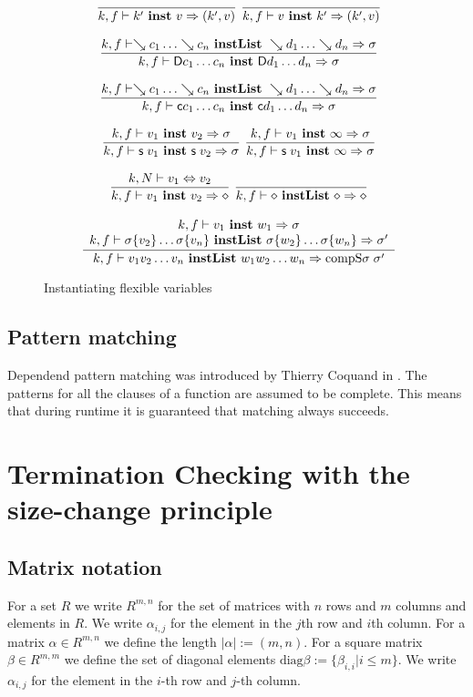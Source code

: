 \begin{figure}
\begin{gather*}
\nru{}
{}
{\inst{k}{f}{k'}{v}{(k',v)}}
%
\nru{}
{}
{\inst{k}{f}{v}{k'}{(k',v)}}
%
\\[2ex]
\nru{}
{{\instlist{k}{f}{\wh{c_1} \ldots \wh{c_n}}{\wh{d_1} \ldots \wh{d_n}}{\sigma}}}
{\inst{k}{f}{\DD c_1 \ldots c_n}{\DD d_1 \ldots d_n}{\sigma}
}
\\[2ex]
\nru{}
{{\instlist{k}{f}{\wh{c_1} \ldots \wh{c_n}}{\wh{d_1} \ldots \wh{d_n}}{\sigma}}}
{\inst{k}{f}{\cc c_1 \ldots c_n}{\cc d_1 \ldots d_n}{\sigma}
}
\\[2ex]
\nru{}
{\inst{k}{f}{v_1}{v_2}{\sigma}}
{\inst{k}{f}{\s v_1}{\s v_2}{\sigma}
}
\nru{}
{\inst{k}{f}{v_1}{\infty}{\sigma}}
{\inst{k}{f}{\s v_1}{\infty}{\sigma}
}
\\[2ex]
\nru{}
{\EqVal{k}{N}{v_1}{v_2}}
{\inst{k}{f}{v_1}{v_2}{\diamond}
}
\nru{}
{}
{\instlist{k}{f}{\diamond}{\diamond}{\diamond}}
\\[2ex]
\ndru{}
{\inst{k}{f}{v_1}{w_1}{\sigma}}
{\instlist{k}{f}{\subst{\sigma}{v_2} \ldots \subst{\sigma}{v_n}}{\subst{\sigma}{w_2} \ldots \subst{\sigma}{w_n}}{\sigma'}}
{\instlist{k}{f}{v_1 v_2 \ldots v_n}{w_1 w_2 \ldots w_n}{\compS \sigma \sigma'}}
\end{gather*}
\caption{Instantiating flexible variables}
\end{figure}

\section{Pattern matching}
Dependend pattern matching was introduced by Thierry Coquand in \cite{coquand92pattern}.
The patterns for all the clauses of a function are assumed to be complete. This means that during runtime
it is guaranteed that matching always succeeds.

\chapter{Termination Checking with the size-change principle}

\section{Matrix notation}

\newcommand{\diag}{\mathrm{diag}}

For a set $R$ we write $R^{m,n}$ for the set of matrices with $n$ rows and $m$ columns and elements in $R$.
We write $\alpha_{i,j}$ for the element in the $j$th row and $i$th column.
For a matrix $\alpha \in R^{m,n}$ we define the length $|\alpha| := (m,n)$.
For a square matrix $\beta \in R^{m,m}$ we define the set of diagonal elements $\diag \beta := \{ \beta_{i,i} \vert i \leq m\}$.
We write $\alpha_{i,j}$ for the element in the $i$-th row and $j$-th column.


